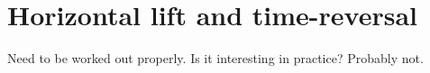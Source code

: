 \section{Horizontal lift and time-reversal}
\label{sec:horizontal-lift-time}

Need to be worked out properly. Is it interesting in practice? Probably not.

